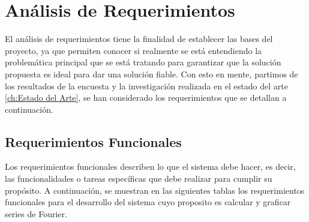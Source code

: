 \section{Análisis de Requerimientos}
El análisis de requerimientos tiene la finalidad de establecer las bases del proyecto, ya que permiten conocer si realmente se está entendiendo la problemática principal que se está tratando para garantizar que la solución propuesta es ideal para dar una solución fiable. 
Con esto en mente, partimos de los resultados de la encuesta y la investigación realizada en el estado del arte \ref{ch:Estado del Arte}, se han considerado los requerimientos que se detallan a continuación.
\subsection{Requerimientos Funcionales}
Los requerimientos funcionales describen lo que el sistema debe hacer, es decir, las funcionalidades o tareas específicas que debe realizar para cumplir su propósito. A continuación, se muestran en las siguientes tablas los requerimientos funcionales para el desarrollo del sistema cuyo proposito es calcular y graficar series de Fourier.


